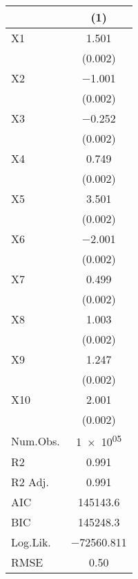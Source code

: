 \begin{table}
\centering
\begin{tabular}[t]{lc}
\toprule
  & (1)\\
\midrule
X1 & \num{1.501}\\
 & \vphantom{9} (\num{0.002})\\
X2 & \num{-1.001}\\
 & \vphantom{8} (\num{0.002})\\
X3 & \num{-0.252}\\
 & \vphantom{7} (\num{0.002})\\
X4 & \num{0.749}\\
 & \vphantom{6} (\num{0.002})\\
X5 & \num{3.501}\\
 & \vphantom{5} (\num{0.002})\\
X6 & \num{-2.001}\\
 & \vphantom{4} (\num{0.002})\\
X7 & \num{0.499}\\
 & \vphantom{3} (\num{0.002})\\
X8 & \num{1.003}\\
 & \vphantom{2} (\num{0.002})\\
X9 & \num{1.247}\\
 & \vphantom{1} (\num{0.002})\\
X10 & \num{2.001}\\
 & (\num{0.002})\\
\midrule
Num.Obs. & \num{1e+05}\\
R2 & \num{0.991}\\
R2 Adj. & \num{0.991}\\
AIC & \num{145143.6}\\
BIC & \num{145248.3}\\
Log.Lik. & \num{-72560.811}\\
RMSE & \num{0.50}\\
\bottomrule
\end{tabular}
\end{table}

